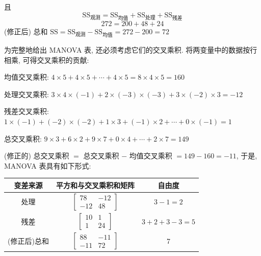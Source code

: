 且
\[
\mathrm{SS}_{\text{观测}}=\mathrm{SS}_{\text{均值}}+\mathrm{SS}_{\text{处理}}+\mathrm{SS}_{\text{残差}}
\]
\[
272=200+48+24
\]
(修正后) 总和 $\mathrm{SS}=\mathrm{SS}_{\text{观测}}-\mathrm{SS}_{\text{均值}}=272-200=72$

为完整地给出 MANOVA 表, 还必须考虑它们的交叉乘积. 将两变量中的数据按行相乘, 可得交叉乘积的贡献:

\noindent 均值交叉乘积: $4\times5+4\times5+\cdots+4\times5=8\times4\times5=160$

\noindent 处理交叉乘积: $3\times4\times(-1)+2\times(-3)\times(-3)+3\times(-2)\times3=-12$

\noindent 残差交叉乘积: $1\times(-1)+(-2)\times(-2)+1\times3+(-1)\times2+\cdots+0\times(-1)=1$

\noindent 总交叉乘积: $9\times3+6\times2+9\times7+0\times4+\cdots+2\times7=149$

(修正的) 总交叉乘积 $=$ 总交叉乘积 $-$ 均值交叉乘积 $=149-160=-11$, 于是, MANOVA 表具有如下形式:

\begin{mvtable}
\begin{tabular}{ccc}
\toprule
变差来源 & 平方和与交叉乘积和矩阵 & 自由度\\
\midrule
处理 & $\begin{bmatrix}78&-12\\-12&48\end{bmatrix}$ & $3-1=2$\\[10pt]
残差 & $\begin{bmatrix}10&1\\1&24\end{bmatrix}$ & $3+2+3-3=5$\\[10pt]
(修正后)总和 & $\begin{bmatrix}88&-11\\-11&72\end{bmatrix}$ & 7\\
\bottomrule
\end{tabular}
\end{mvtable}
